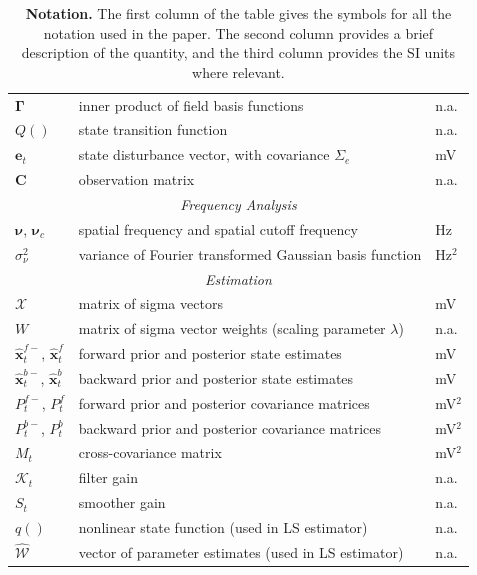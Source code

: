 \documentclass[review,authoryear,3p]{elsarticle}
\begin{document}
\begin{table}[!ht]
\begin{tabular}{|l|l|l|}
   	$\boldsymbol{\Gamma}$ & inner product of field basis functions & n.a.\\
   	$Q()$ & state transition function & n.a.\\
   	$\mathbf{e}_t$ & state disturbance vector, with covariance $\Sigma_e$ & mV\\
   	$\mathbf{C}$ & observation matrix & n.a. \\
	\hline
	\multicolumn{3}{|c|}{\emph{Frequency Analysis}} \\
	\hline
	$\boldsymbol{\nu}$, $\boldsymbol{\nu}_c$ & spatial frequency and spatial cutoff frequency & Hz \\
	$\sigma_{\nu}^2$ & variance of Fourier transformed Gaussian basis function & Hz$^2$\\
	\hline
	\multicolumn{3}{|c|}{\emph{Estimation}} \\
	\hline
	$\mathcal{X}$ & matrix of sigma vectors & mV\\
	$W$ & matrix of sigma vector weights (scaling parameter $\lambda$) & n.a.\\
   	$\hat{\mathbf{x}}_t^{f-}$, $\hat{\mathbf{x}}_t^f$ & forward prior and posterior state estimates & mV\\
   	$\hat{\mathbf{x}}_t^{b-}$, $\hat{\mathbf{x}}_t^{b}$ & backward prior and posterior state estimates & mV\\
 	$P^{f-}_t$, $P^f_t$  & forward prior and posterior covariance matrices & mV$^2$\\
   	$P^{b-}_t$, $P^b_t$ & backward prior and posterior covariance matrices & mV$^2$\\
	$M_t$& cross-covariance matrix & mV$^2$\\
	$\mathcal K_{t} $ & filter gain & n.a.\\
	$S_t$ & smoother gain & n.a.\\
	$q()$ & nonlinear state function (used in LS estimator) & n.a.\\
   	$\mathcal{\hat{W}}$& vector of parameter estimates (used in LS estimator) & n.a.\\	
	\hline
\end{tabular}
\caption{\textbf{Notation.} The first column of the table gives the symbols for all the notation used in the paper. The second column provides a brief description of the quantity, and the third column provides the SI units where relevant.}
\label{tab:Notation}
\end{table}
\clearpage
\newpage
\renewcommand{\arraystretch}{1.7}
\end{document}
